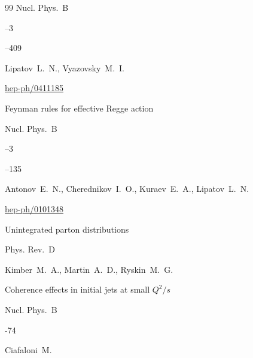 \begin{thebibliography}{99}
\jour Nucl. Phys.~B 


--3 

--409

\by Lipatov~L.~N.,  Vyazovsky~M.~I.







\arxiv \href{http://arxiv.org/abs/hep-ph/0411185}{hep-ph/0411185}

\paper Feynman rules for effective Regge action


\jour Nucl. Phys.~B 


--3 

--135

\by  Antonov~E.~N., Cherednikov~I.~O., Kuraev~E.~A., Lipatov~L.~N.







\arxiv \href{http://arxiv.org/abs/hep-ph/0101348}{hep-ph/0101348}

\paper Unintegrated parton distributions


\jour Phys. Rev.~D 



\by Kimber~M.~A., Martin~A.~D., Ryskin~M.~G.






\paper Coherence effects in initial jets at small $Q^2/s$


\jour Nucl. Phys.~B 



-74

\by Ciafaloni~M.





\end{thebibliography}
